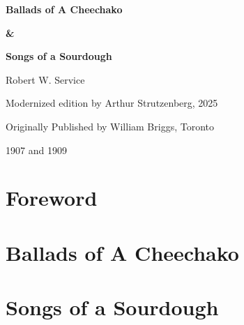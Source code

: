 \documentclass[10pt]{book}
\begin{document}
\begin{titlepage}
    \centering
    {\Huge\bfseries Ballads of A Cheechako\par}
    {\Huge\bfseries \&\par}
    {\Huge\bfseries Songs of a Sourdough\par}
    \vspace{2cm}

    {\Large Robert W. Service\par}
    \vfill
    {\large Modernized edition by Arthur Strutzenberg, 2025\par}
    \vspace{1cm}    {\large Originally Published by William Briggs, Toronto\par}
    {\large 1907 and 1909}
\end{titlepage}

\frontmatter
\tableofcontents
\newpage

\mainmatter

\cleardoublepage
\chapter*{Foreword}



\cleardoublepage
\chapter*{Ballads of A Cheechako}


\cleardoublepage
\chapter*{Songs of a Sourdough}

\end{document}
